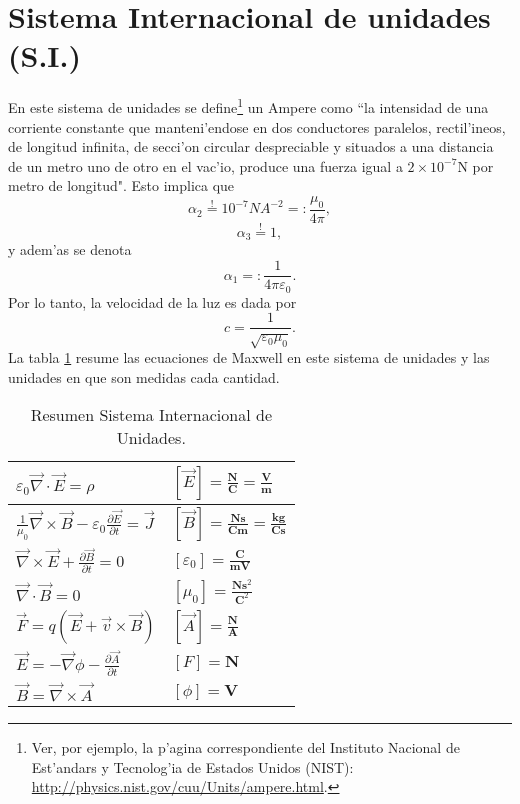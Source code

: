 \section{Sistema Internacional de unidades (S.I.)}
En este sistema de unidades se define\footnote{Ver, por ejemplo, la p'agina correspondiente del Instituto Nacional de Est'andars y Tecnolog'ia de Estados Unidos (NIST): \url{http://physics.nist.gov/cuu/Units/ampere.html}.} un Ampere como ``la intensidad de una corriente constante que manteni'endose en dos conductores paralelos, rectil'ineos, de longitud infinita, de secci'on circular despreciable y situados a una distancia de un metro uno de otro en el vac'io, produce una fuerza igual a $2\times 10^{-7}$N por metro de longitud". Esto implica que
\begin{equation}
\alpha_2\stackrel{!}{=} 10^{-7}NA^{-2}=:\frac{\mu_0}{4\pi},
\end{equation}
\begin{equation}
\alpha_3\stackrel{!}{=} 1,
\end{equation}
y adem'as se denota
\begin{equation}
\alpha_1=:\frac{1}{4\pi\varepsilon_0}.
\end{equation}
Por lo tanto, la velocidad de la luz es dada por
\begin{equation}
c=\frac{1}{\sqrt{\varepsilon_0\mu_0}}.
\end{equation}
La tabla \ref{TUSI} resume las ecuaciones de Maxwell en este sistema de unidades y las unidades en que son medidas cada cantidad. 
\begin{table}
\begin{center}
\begin{tabular}{|l|l|}\hline
$\varepsilon_0\vec{\nabla}\cdot\vec{E}=\rho$ & $\left[ \vec{E}
\right] =\frac{\mathbf{N}}{\mathbf{C}}=\frac{\mathbf{V}}{\mathbf{m}}$\\\hline
$\frac{1}{\mu_0}\vec{\nabla}\times \vec{B}-\varepsilon_0\frac{\partial
\vec{E}}{\partial t}= \vec{J}$ &
$\left[\vec{B}\right]=\frac{\mathbf{N}\mathbf{s}}{\mathbf{C}\mathbf{m}}
=\frac{\mathbf{kg}}{\mathbf{C}\mathbf{s}}$\\\hline
$\vec{\nabla}\times \vec{E}+\frac{\partial\vec{B}}{\partial t}=0$ &
$\left[\varepsilon_0\right]=\frac{\mathbf{C}}{\mathbf{m}\mathbf{V}}$\\\hline
$\vec{\nabla}\cdot\vec{B}=0$ & $\left[\mu_0\right]=\frac{\mathbf{N}\mathbf{s}^2}
{\mathbf{C}^2}$\\\hline
$\vec{F}=q\left(\vec{E}+\vec{v}\times\vec{B}\right) $ &
$\left[\vec{A}\right]=\frac{\mathbf{N}}{\mathbf{A}}$\\\hline
$\vec{E}=-\vec{\nabla}\phi-\frac{\partial\vec{A}}{\partial t}$ &
$\left[F\right]=\mathbf{N}$\\\hline
$\vec{B}=\vec{\nabla}\times \vec{A}$ & $\left[\phi\right]=\mathbf{V}$ \\\hline
\end{tabular}
\label{TUSI}
\caption{Resumen Sistema Internacional de Unidades.}
\end{center}
\end{table}


